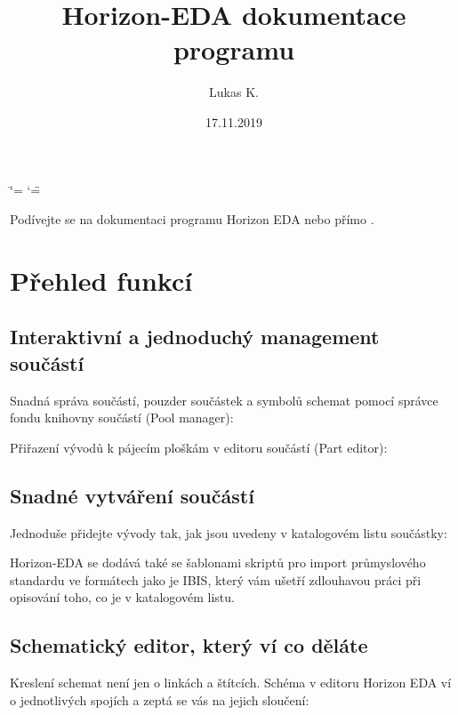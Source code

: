 \documentclass[letterpaper,10pt,czech]{sphinxmanual}
\title{Horizon-EDA dokumentace programu}
\date{17.11.2019}
\author{Lukas K.}
\begin{document}
\ifdefined\shorthandoff
  \ifnum\catcode`\=\string=\active\shorthandoff{=}\fi
  \ifnum\catcode`\"=\active{}\fi
\fi

\pagestyle{empty}
\sphinxmaketitle
\pagestyle{plain}
\sphinxtableofcontents
\pagestyle{normal}
\label{\detokenize{index::doc}}


Podívejte se na dokumentaci programu Horizon EDA {\hyperref[\detokenize{feature-overview::doc}]{}} nebo přímo {\hyperref[\detokenize{getting-started::doc}]{}}.

\noindent{}


\chapter{Přehled funkcí}
\label{\detokenize{feature-overview:prehled-funkci}}\label{\detokenize{feature-overview::doc}}

\section{Interaktivní a jednoduchý management součástí}
\label{\detokenize{feature-overview:interaktivni-a-jednoduchy-management-soucasti}}
Snadná správa součástí, pouzder součástek a symbolů schemat pomocí správce fondu knihovny součástí (Pool manager):

\noindent{}

Přiřazení vývodů k pájecím ploškám v editoru součástí (Part editor):

\noindent{}


\section{Snadné vytváření součástí}
\label{\detokenize{feature-overview:snadne-vytvareni-soucasti}}
Jednoduše přidejte vývody tak, jak jsou uvedeny v katalogovém listu součástky:

\noindent{}

Horizon-EDA se dodává také se šablonami skriptů pro import průmyslového standardu
ve formátech jako je IBIS, který vám ušetří zdlouhavou práci při opisování toho, co je v katalogovém listu.


\section{Schematický editor, který ví co děláte}
\label{\detokenize{feature-overview:schematicky-editor-ktery-vi-co-delate}}
Kreslení schemat není jen o linkách a štítcích. Schéma v editoru Horizon EDA
ví o jednotlivých spojích a zeptá se vás na jejich sloučení:
\end{document}
